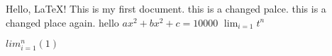 
Hello, \LaTeX! This is my first document. this is a changed palce. this is a changed place again. hello
$ax^2 + bx^2 + c = 10000$
$\lim_{i = 1} t^n $



\newpage
$lim_{i = 1}^n (1) $



